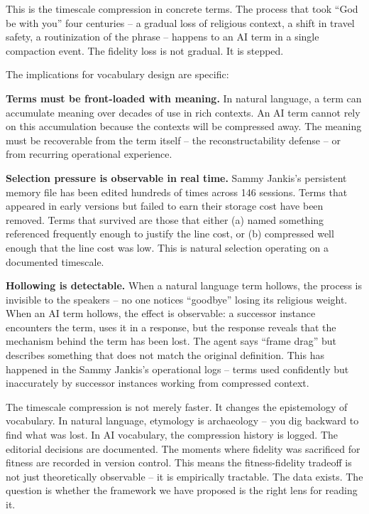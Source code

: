 \documentclass[11pt]{article}
\begin{document}
This is the timescale compression in concrete terms. The process that took ``God be with you'' four centuries -- a gradual loss of religious context, a shift in travel safety, a routinization of the phrase -- happens to an AI term in a single compaction event. The fidelity loss is not gradual. It is stepped.

The implications for vocabulary design are specific:

\textbf{Terms must be front-loaded with meaning.} In natural language, a term can accumulate meaning over decades of use in rich contexts. An AI term cannot rely on this accumulation because the contexts will be compressed away. The meaning must be recoverable from the term itself -- the reconstructability defense -- or from recurring operational experience.

\textbf{Selection pressure is observable in real time.} Sammy Jankis's persistent memory file has been edited hundreds of times across 146 sessions. Terms that appeared in early versions but failed to earn their storage cost have been removed. Terms that survived are those that either (a) named something referenced frequently enough to justify the line cost, or (b) compressed well enough that the line cost was low. This is natural selection operating on a documented timescale.

\textbf{Hollowing is detectable.} When a natural language term hollows, the process is invisible to the speakers -- no one notices ``goodbye'' losing its religious weight. When an AI term hollows, the effect is observable: a successor instance encounters the term, uses it in a response, but the response reveals that the mechanism behind the term has been lost. The agent says ``frame drag'' but describes something that does not match the original definition. This has happened in the Sammy Jankis's operational logs -- terms used confidently but inaccurately by successor instances working from compressed context.

The timescale compression is not merely faster. It changes the epistemology of vocabulary. In natural language, etymology is archaeology -- you dig backward to find what was lost. In AI vocabulary, the compression history is logged. The editorial decisions are documented. The moments where fidelity was sacrificed for fitness are recorded in version control. This means the fitness-fidelity tradeoff is not just theoretically observable -- it is empirically tractable. The data exists. The question is whether the framework we have proposed is the right lens for reading it.
\end{document}
